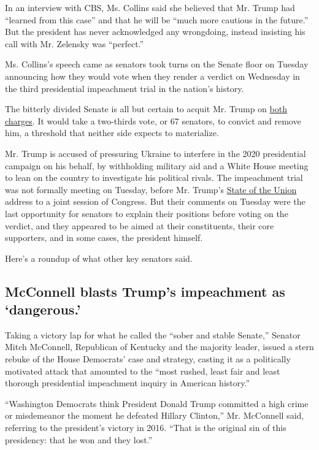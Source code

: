 In an interview with CBS, Ms. Collins said she believed that Mr. Trump
had ``learned from this case'' and that he will be ``much more cautious
in the future.'' But the president has never acknowledged any
wrongdoing, instead insisting his call with Mr. Zelensky was
``perfect.''

Ms. Collins's speech came as senators took turns on the Senate floor on
Tuesday announcing how they would vote when they render a verdict on
Wednesday in the third presidential impeachment trial in the nation's
history.

The bitterly divided Senate is all but certain to acquit Mr. Trump on
\href{https://www.nytimes3xbfgragh.onion/interactive/2020/01/22/us/politics/impeachment-articles-arguments.html}{both
charges}. It would take a two-thirds vote, or 67 senators, to convict
and remove him, a threshold that neither side expects to materialize.

Mr. Trump is accused of pressuring Ukraine to interfere in the 2020
presidential campaign on his behalf, by withholding military aid and a
White House meeting to lean on the country to investigate his political
rivals. The impeachment trial was not formally meeting on Tuesday,
before Mr. Trump's
\href{https://www.nytimes3xbfgragh.onion/2020/02/04/us/politics/what-time-is-state-of-the-union.html}{State
of the Union} address to a joint session of Congress. But their comments
on Tuesday were the last opportunity for senators to explain their
positions before voting on the verdict, and they appeared to be aimed at
their constituents, their core supporters, and in some cases, the
president himself.

Here's a roundup of what other key senators said.

\hypertarget{mcconnell-blasts-trumps-impeachment-as-dangerous}{%
\subsection{McConnell blasts Trump's impeachment as
`dangerous.'}\label{mcconnell-blasts-trumps-impeachment-as-dangerous}}

Taking a victory lap for what he called the ``sober and stable Senate,''
Senator Mitch McConnell, Republican of Kentucky and the majority leader,
issued a stern rebuke of the House Democrats' case and strategy, casting
it as a politically motivated attack that amounted to the ``most rushed,
least fair and least thorough presidential impeachment inquiry in
American history.''

``Washington Democrats think President Donald Trump committed a high
crime or misdemeanor the moment he defeated Hillary Clinton,'' Mr.
McConnell said, referring to the president's victory in 2016. ``That is
the original sin of this presidency: that he won and they lost.''

